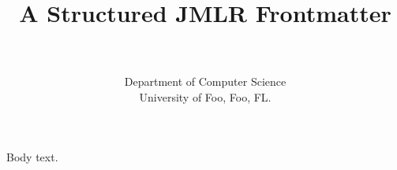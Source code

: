 \documentclass{jmlr}
\begin{document}
\title{A Structured JMLR Frontmatter}
\author{  \\
    \\
  \addr Department of Computer Science\\ University of Foo, Foo, FL.}
\maketitle
Body text.
\end{document}

